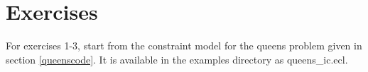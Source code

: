 %
%
%

\section{Exercises}

For exercises 1-3, start from the constraint model for the queens problem
given in section \ref{queenscode}. It is available in the examples directory
as queens_ic.ecl.

